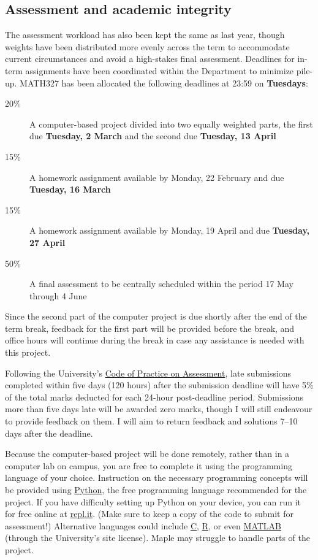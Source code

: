 \subsection*{Assessment and academic integrity}
The assessment workload has also been kept the same as last year, though weights have been distributed more evenly across the term to accommodate current circumstances and avoid a high-stakes final assessment.
Deadlines for in-term assignments have been coordinated within the Department to minimize pile-up.
MATH327 has been allocated the following deadlines at 23:59 on \textbf{Tuesdays}:
\begin{description}
  \item[20\%] A computer-based project divided into two equally weighted parts, the first due \textbf{Tuesday, 2 March} and the second due \textbf{Tuesday, 13 April}
  \item[15\%] A homework assignment available by Monday, 22 February and due \textbf{Tuesday, 16 March}
  \item[15\%] A homework assignment available by Monday, 19 April and due \textbf{Tuesday, 27 April}
  \item[50\%] A final assessment to be centrally scheduled within the period 17 May through 4 June
\end{description}
Since the second part of the computer project is due shortly after the end of the term break, feedback for the first part will be provided before the break, and office hours will continue during the break in case any assistance is needed with this project.

Following the University's \href{https://www.liverpool.ac.uk/media/livacuk/tqsd/aqsd/code_of_practice_on_assessment.pdf}{Code of Practice on Assessment}, late submissions completed within five days (120 hours) after the submission deadline will have 5\% of the total marks deducted for each 24-hour post-deadline period.
Submissions more than five days late will be awarded zero marks, though I will still endeavour to provide feedback on them.
I will aim to return feedback and solutions 7--10 days after the deadline.

Because the computer-based project will be done remotely, rather than in a computer lab on campus, you are free to complete it using the programming language of your choice.
Instruction on the necessary programming concepts will be provided using \href{https://www.python.org}{Python}, the free programming language recommended for the project.
If you have difficulty setting up Python on your device, you can run it for free online at \href{https://repl.it/languages/python3}{repl.it}.
(Make sure to keep a copy of the code to submit for assessment!)
Alternative languages could include \href{https://en.wikipedia.org/wiki/C_(programming_language)}{C}, \href{https://www.r-project.org}{R}, or even \href{https://matlab.mathworks.com}{MATLAB} (through the University's site license).
Maple may struggle to handle parts of the project.

